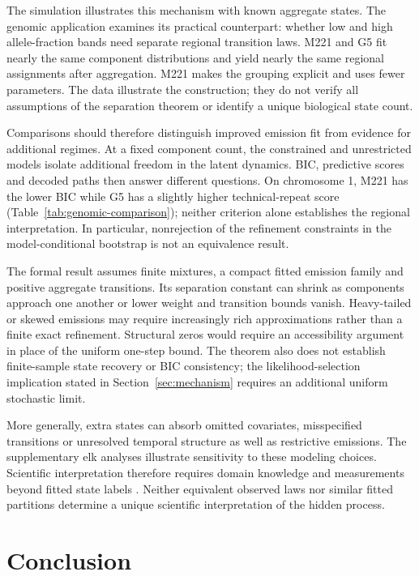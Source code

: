 \documentclass[11pt]{article}
\theoremstyle{definition}
\begin{document}
The simulation illustrates this mechanism with known aggregate states. The
genomic application examines its practical counterpart: whether low and
high allele-fraction bands need separate regional transition laws. M221
and G5 fit nearly the same component distributions and yield nearly the
same regional assignments after aggregation. M221 makes the grouping
explicit and uses fewer parameters. The data illustrate the construction;
they do not verify all assumptions of the separation theorem or identify a
unique biological state count.

Comparisons should therefore distinguish improved emission fit from evidence
for additional regimes. At a fixed component count, the constrained and
unrestricted models isolate additional freedom in the latent dynamics.
BIC, predictive scores and decoded paths then answer different questions.
On chromosome 1, M221 has the lower BIC while G5 has a slightly higher
technical-repeat score (Table~\ref{tab:genomic-comparison}); neither criterion
alone establishes the regional interpretation.
In particular, nonrejection of the refinement constraints in the
model-conditional bootstrap is not an equivalence result.

The formal result assumes finite mixtures, a compact fitted emission family
and positive aggregate transitions. Its separation constant can shrink as
components approach one another or lower weight and transition bounds vanish.
Heavy-tailed or skewed emissions may require increasingly rich approximations
rather than a finite exact refinement. Structural zeros would require an
accessibility argument in place of the uniform one-step bound. The theorem
also does not establish finite-sample state recovery or BIC consistency;
the likelihood-selection implication stated in Section~\ref{sec:mechanism}
requires an additional uniform stochastic limit.

More generally, extra states can absorb omitted covariates, misspecified
transitions or unresolved temporal structure as well as restrictive
emissions. The supplementary elk analyses illustrate sensitivity to these
modeling choices. Scientific interpretation therefore requires domain
knowledge and measurements beyond fitted state labels
\citep{PohleEtAl2017,McClintockEtAl2020}. Neither equivalent observed laws
nor similar fitted partitions determine a unique scientific interpretation
of the hidden process.

\section{Conclusion}\label{sec:conclusion}
\end{document}
